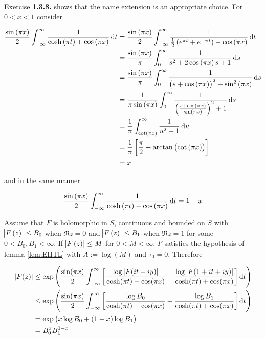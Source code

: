 \begin{remark}
	Exercise \textbf{1.3.8.} \textup{\cite[48]{grafakos:fourier:2014}} shows that the name extension is an appropriate choice. For $0 < x < 1$ consider

	\begin{equation*}
		\begin{aligned}
			\frac{\sin\left( \pi x \right)}{2} \int_{-\infty}^\infty \frac{1}{\cosh\left( \pi t \right) + \cos\left( \pi x \right)} \mathop{}\!\mathrm{d} t &= \frac{\sin\left( \pi x \right)}{2} \int_{-\infty}^\infty \frac{1}{\frac{1}{2}\left( e^{\pi t} + e^{-\pi t} \right) + \cos\left( \pi x \right)} \mathop{}\!\mathrm{d} t\\
			&= \frac{\sin\left( \pi x \right)}{\pi} \int_{0}^\infty \frac{1}{s^2 + 2\cos\left( \pi x \right)s + 1} \mathop{}\!\mathrm{d} s\\
			&= \frac{\sin\left( \pi x \right)}{\pi} \int_{0}^\infty \frac{1}{\left( s + \cos\left( \pi x \right) \right)^2 + \sin^2\left( \pi x \right)} \mathop{}\!\mathrm{d} s\\
			&= \frac{1}{\pi\sin\left( \pi x \right)} \int_{0}^\infty \frac{1}{\left( \frac{s + \cos\left( \pi x \right)}{\sin\left( \pi x \right)} \right)^2 + 1} \mathop{}\!\mathrm{d} s\\
			&= \frac{1}{\pi} \int_{\cot\left( \pi x \right)}^\infty \frac{1}{u^2 + 1} \mathop{}\!\mathrm{d} u\\
			&= \frac{1}{\pi}\left[ \frac{\pi}{2} - \arctan\left( \cot\left( \pi x \right) \right) \right]\\
			&= x
		\end{aligned}
	\end{equation*}

	\noindent and in the same manner

	\begin{equation*}
		\frac{\sin\left( \pi x \right)}{2} \int_{-\infty}^\infty \frac{1}{\cosh\left( \pi t \right) - \cos\left( \pi x \right)} \mathop{}\!\mathrm{d} t = 1 - x	
	\end{equation*}

	Assume that $F$ is holomorphic in $S$, continuous and bounded on $\overline{S}$ with $\abs{F\left( z \right)} \leq B_0$ when $\Re z = 0$ and $\abs{F\left( z \right)} \leq B_1$ when $\Re z = 1$ for some $0 < B_0, B_1 < \infty$. If $\abs{F\left( z \right)} \leq M$ for $0 < M < \infty$, $F$ satisfies the hypothesis of lemma \ref{lem:EHTL} with $A := \log\left( M \right)$ and $\tau_0 = 0$. Therefore 
	
	\begin{equation*}
		\begin{aligned}
		\vert F(z) \vert &\leq \exp\left( \frac{\sin(\pi x)}{2} \int_{-\infty}^\infty \left[ \frac{\log \vert F(it + iy)\vert}{\cosh(\pi t) - \cos(\pi x)} + \frac{\log \vert F(1 + it + iy)\vert}{\cosh(\pi t) + \cos(\pi x)} \right] \mathop{}\!\mathrm{d} t\right)\\
		&\leq \exp\left( \frac{\sin(\pi x)}{2} \int_{-\infty}^\infty \left[ \frac{\log B_0}{\cosh(\pi t) - \cos(\pi x)} + \frac{\log B_1}{\cosh(\pi t) + \cos(\pi x)} \right] \mathop{}\!\mathrm{d} t\right)\\
		&= \exp\left( x\log B_0 + \left( 1 - x\right)\log B_1 \right)\\
		&= B_0^xB_1^{1 - x}
		\end{aligned}
	\end{equation*}


\end{remark}
